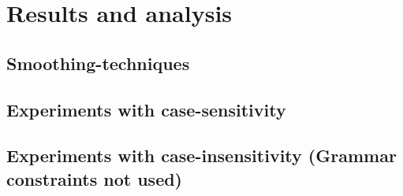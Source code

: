 \section{Results and analysis}

\subsection{Smoothing-techniques}
\vspace{1em}
\subsection*{Experiments with case-sensitivity}
\subsection*{Experiments with case-insensitivity (Grammar constraints not used)}